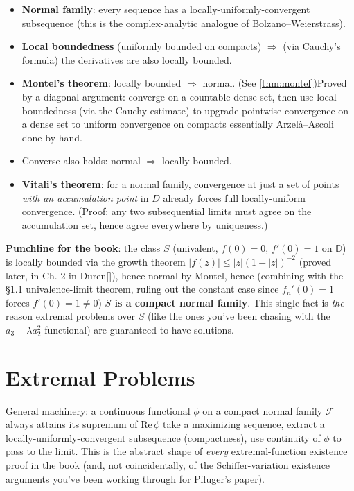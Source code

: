 \documentclass[
]{book}
\providecommand{\tightlist}{%
  \setlength{\itemsep}{0pt}\setlength{\parskip}{0pt}}
\theoremstyle{definition}
\theoremstyle{definition}
\theoremstyle{definition}
\theoremstyle{definition}
\theoremstyle{remark}
\begin{document}
\begin{itemize}
\tightlist
\item
  \textbf{Normal family}: every sequence has a locally-uniformly-convergent subsequence (this is the complex-analytic analogue of Bolzano--Weierstrass).
\item
  \textbf{Local boundedness} (uniformly bounded on compacts) \(\Rightarrow\) (via Cauchy's formula) the derivatives are also locally bounded.
\item
  \textbf{Montel's theorem}: locally bounded \(\Rightarrow\) normal. (See \ref{thm:montel})Proved by a diagonal argument: converge on a countable dense set, then use local boundedness (via the Cauchy estimate) to upgrade pointwise convergence on a dense set to uniform convergence on compacts essentially Arzelà--Ascoli done by hand.
\item
  Converse also holds: normal \(\Rightarrow\) locally bounded.
\item
  \textbf{Vitali's theorem}: for a normal family, convergence at just a set of points \emph{with an accumulation point} in \(D\) already forces full locally-uniform convergence. (Proof: any two subsequential limits must agree on the accumulation set, hence agree everywhere by uniqueness.)
\end{itemize}

\textbf{Punchline for the book}: the class \(S\) (univalent, \(f(0)=0\), \(f'(0)=1\) on \(\mathbb{D}\)) is locally bounded via the growth theorem \(|f(z)| \le |z|(1-|z|)^{-2}\) (proved later, in Ch. 2 in Duren{[}{]}), hence normal by Montel, hence (combining with the §1.1 univalence-limit theorem, ruling out the constant case since \(f_n'(0)=1\) forces \(f'(0)=1\ne 0\)) \textbf{\(S\) is a compact normal family}. This single fact is \emph{the} reason extremal problems over \(S\) (like the ones you've been chasing with the \(a_3 - \lambda a_2^2\) functional) are guaranteed to have solutions.

\section{Extremal Problems}\label{extremal-problems}

General machinery: a continuous functional \(\phi\) on a compact normal family \(\mathcal{F}\) always attains its supremum of \(\mathrm{Re}\,\phi\) take a maximizing sequence, extract a locally-uniformly-convergent subsequence (compactness), use continuity of \(\phi\) to pass to the limit. This is the abstract shape of \emph{every} extremal-function existence proof in the book (and, not coincidentally, of the Schiffer-variation existence arguments you've been working through for Pfluger's paper).
\end{document}
